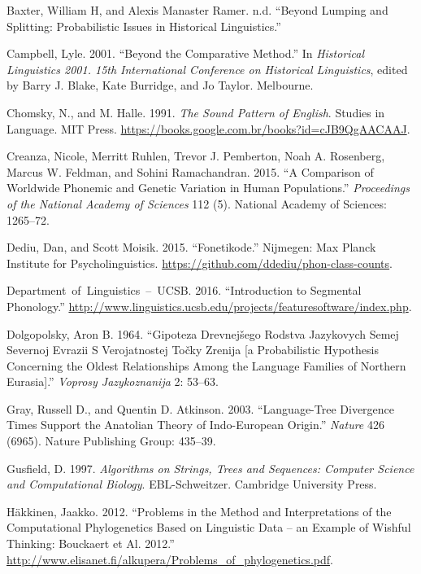 \documentclass[a4paper]{article}
\begin{document}

\begin{thebibliography}{99}

Baxter, William H, and Alexis Manaster Ramer. n.d. ``Beyond Lumping and
Splitting: Probabilistic Issues in Historical Linguistics.''

Campbell, Lyle. 2001. ``Beyond the Comparative Method.'' In
\emph{Historical Linguistics 2001. 15th International Conference on
Historical Linguistics}, edited by Barry J. Blake, Kate Burridge, and Jo
Taylor. Melbourne.

Chomsky, N., and M. Halle. 1991. \emph{The Sound Pattern of English}.
Studies in Language. MIT Press.
\url{https://books.google.com.br/books?id=cJB9QgAACAAJ}.

Creanza, Nicole, Merritt Ruhlen, Trevor J. Pemberton, Noah A. Rosenberg,
Marcus W. Feldman, and Sohini Ramachandran. 2015. ``A Comparison of
Worldwide Phonemic and Genetic Variation in Human Populations.''
\emph{Proceedings of the National Academy of Sciences} 112 (5). National
Academy of Sciences: 1265--72.

Dediu, Dan, and Scott Moisik. 2015. ``Fonetikode.'' Nijmegen: Max Planck
Institute for Psycholinguistics.
\url{https://github.com/ddediu/phon-class-counts}.

Department~of~Linguistics~--~UCSB. 2016. ``Introduction to Segmental
Phonology.''
\url{http://www.linguistics.ucsb.edu/projects/featuresoftware/index.php}.

Dolgopolsky, Aron B. 1964. ``Gipoteza Drevnej{\v s}ego Rodstva Jazykovych
Semej Severnoj Evrazii S Verojatnostej To{\v c}ky Zrenija {[}a Probabilistic
Hypothesis Concerning the Oldest Relationships Among the Language
Families of Northern Eurasia{]}.'' \emph{Voprosy Jazykoznanija} 2:
53--63.

Gray, Russell D., and Quentin D. Atkinson. 2003. ``Language-Tree
Divergence Times Support the Anatolian Theory of Indo-European Origin.''
\emph{Nature} 426 (6965). Nature Publishing Group: 435--39.

Gusfield, D. 1997. \emph{Algorithms on Strings, Trees and Sequences:
Computer Science and Computational Biology}. EBL-Schweitzer. Cambridge
University Press.

H{\"a}kkinen, Jaakko. 2012. ``Problems in the Method and Interpretations of
the Computational Phylogenetics Based on Linguistic Data -- an Example
of Wishful Thinking: Bouckaert et Al. 2012.''
\url{http://www.elisanet.fi/alkupera/Problems_of_phylogenetics.pdf}.


\end{thebibliography}
\end{document}
